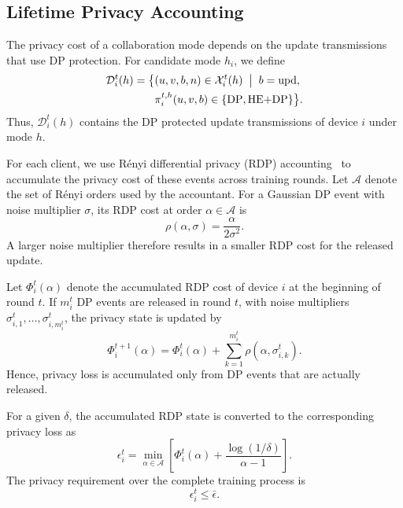 \documentclass[5p,times]{elsarticle}
\theoremstyle{plain}
\theoremstyle{definition}
\theoremstyle{remark}
\begin{document}
\subsection{Lifetime Privacy Accounting}
\label{sec:privacy_model}

The privacy cost of a collaboration mode depends on the update
transmissions that use DP protection. For candidate mode \(h_i\), we define
\begin{equation}
\begin{aligned}
\mathcal D_i^t(h)
=
\bigl\{
&(u,v,b,n)\in\mathcal X_i^t(h)
\;\bigm|\;
b=\mathrm{upd},\\
&\pi_i^{t,h}(u,v,b)
\in\{\mathrm{DP},\mathrm{HE{+}DP}\}
\bigr\}.
\end{aligned}
\label{eq:dp_exposures}
\end{equation}
Thus, \(\mathcal D_i^t(h)\) contains the DP protected update
transmissions of device \(i\) under mode \(h\).

For each client, we use R\'enyi differential privacy (RDP)
accounting~\cite{mironov2017renyi,wang2019subsampled} to accumulate the
privacy cost of these events across training rounds. Let
\(\mathcal A\) denote the set of R\'enyi orders used by the accountant.
For a Gaussian DP event with noise multiplier \(\sigma\), its RDP cost at
order \(\alpha\in\mathcal A\) is
\begin{equation}
\rho(\alpha,\sigma)
=
\frac{\alpha}{2\sigma^2}.
\label{eq:rdp_event_cost}
\end{equation}
A larger noise multiplier therefore results in a smaller RDP cost for the
released update.

Let \(\Phi_i^t(\alpha)\) denote the accumulated RDP cost of device \(i\)
at the beginning of round \(t\). If \(m_i^t\) DP events are released in
round \(t\), with noise multipliers
\(\sigma_{i,1}^t,\ldots,\sigma_{i,m_i^t}^t\), the privacy state is updated
by
\begin{equation}
\Phi_i^{t+1}(\alpha)
=
\Phi_i^t(\alpha)
+
\sum_{k=1}^{m_i^t}
\rho(\alpha,\sigma_{i,k}^t).
\label{eq:rdp_update}
\end{equation}
Hence, privacy loss is accumulated only from DP events that are actually
released.

For a given \(\delta\), the accumulated RDP state is converted to the
corresponding privacy loss as
\begin{equation}
\epsilon_i^t
=
\min_{\alpha\in\mathcal A}
\left[
\Phi_i^t(\alpha)
+
\frac{\log(1/\delta)}{\alpha-1}
\right].
\label{eq:rdp_to_dp}
\end{equation}
The privacy requirement over the complete training process is
\begin{equation}
\epsilon_i^t
\le
\bar{\epsilon}.
\label{eq:lifetime_privacy_constraint}
\end{equation}
\end{document}
